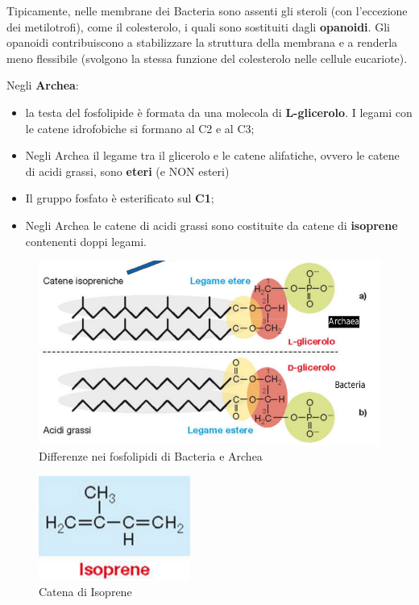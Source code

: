 \documentclass[11pt]{book}
\begin{document}
\vspace{1em}
Tipicamente, nelle membrane dei Bacteria sono assenti gli steroli (con l'eccezione dei metilotrofi), come il colesterolo, i quali sono sostituiti dagli \textbf{opanoidi}.
Gli opanoidi contribuiscono a stabilizzare la struttura della membrana e a renderla meno flessibile (svolgono la stessa funzione del colesterolo nelle cellule eucariote).

\clearpage
Negli \textbf{Archea}:
\begin{itemize}
\item la testa del fosfolipide è formata da una molecola di \textbf{L-glicerolo}. I legami con le catene idrofobiche si formano al C2 e al C3;
\item Negli Archea il legame tra il glicerolo e le catene alifatiche, ovvero le catene di acidi grassi, sono \textbf{eteri} (e NON esteri)
\item Il gruppo fosfato è esterificato sul \textbf{C1};
\item Negli Archea le catene di acidi grassi sono costituite da catene di \textbf{isoprene} contenenti doppi legami.
\end{itemize}

\begin{figure}[htp]
\centering
\includegraphics[scale=0.4]{img/Fosfolipidi.png}
\caption{Differenze nei fosfolipidi di Bacteria e Archea}
\label{}
\end{figure}

\begin{figure}[htp]
\centering
\includegraphics[scale=0.5]{img/Isoprene.png}
\caption{Catena di Isoprene}
\label{}
\end{figure}
\end{document}
